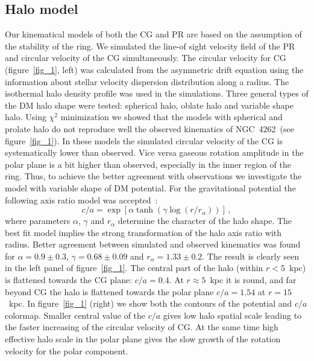 \documentclass[11pt,twoside]{article}
\begin{document}
\subsection{Halo model}
Our  kinematical  models of both the CG and PR are based on the assumption of the stability of the ring. We simulated the line-of sight velocity field of the PR and circular velocity of the CG simultaneously. The circular velocity for CG (figure~\ref{fig_1}, left) was calculated  from the asymmetric drift equation using the information about stellar velocity dispersion distribution along a radius.  The isothermal halo density profile was used in the simulations. Three general types of the DM halo shape were tested: spherical halo, oblate halo and variable shape halo. Using $\chi^2$ minimization we showed that  the  models with spherical and prolate halo do not reproduce well the observed kinematics of NGC~4262~(see figure~\ref{fig_1}).  In these models the simulated circular velocity of the CG is systematically lower than observed. Vice versa gaseous rotation  amplitude in the polar plane is a bit higher than observed, especially in the inner  region of the ring. Thus, to achieve the better agreement with observations we investigate the model with variable shape of DM potential.
For the gravitational potential the following axis ratio model was accepted~\citep{2007MNRAS.377...50H}:
\begin{equation}
\displaystyle c/a = \exp{ \left[ \alpha \tanh{\left( \gamma \log{\left(r/r_{\alpha}\right)}\right)}\right]}\,,
\end{equation}\label{eq::c_to_a_by_Hayashi}
where parameters $\alpha$, $\gamma$ and $r_{\alpha}$ determine the character of the halo shape.
The best fit model implies the strong transformation of the halo axis ratio with radius. Better agreement between simulated and observed kinematics was found for  $\alpha = 0.9 \pm 0.3$, $\gamma = 0.68 \pm 0.09$ and $r_{\alpha} = 1.33 \pm 0.2$.  The result is clearly seen in the left panel of figure~\ref{fig_1}. The central part of the halo (within $r < 5$~kpc) is flattened towards the CG plane: $c/a = 0.4$. At $r \approx 5$~kpc it is round, and far beyond CG the halo is flattened towards the polar plane $c/a = 1.54$ at $r=15$~kpc. In figure~\ref{fig_1} (right)  we show  both the contours of the potential and $c/a$ colormap. Smaller central value of the $c/a$ gives  low halo spatial scale leading to the faster increasing of the circular velocity of CG. At the same time high effective halo scale in the polar plane gives the slow growth of the rotation velocity for the polar component.
\end{document}
